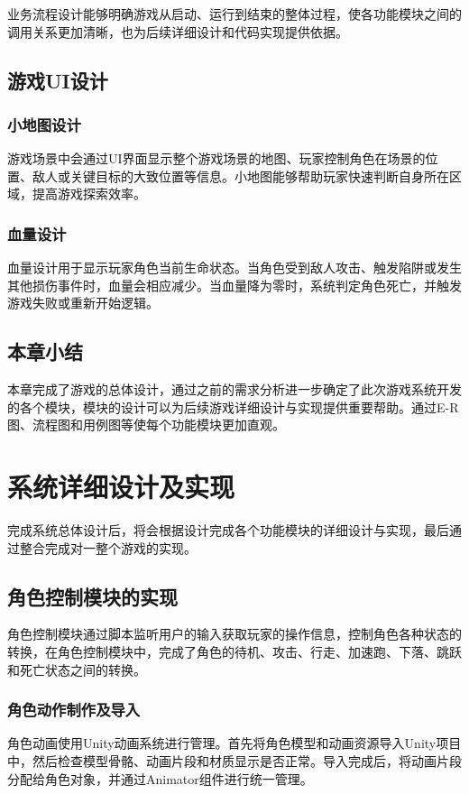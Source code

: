 \documentclass[12pt]{graduate-design-manual}
\begin{document}
业务流程设计能够明确游戏从启动、运行到结束的整体过程，使各功能模块之间的调用关系更加清晰，也为后续详细设计和代码实现提供依据。

\subsection{游戏UI设计}
\subsubsection{小地图设计}
游戏场景中会通过UI界面显示整个游戏场景的地图、玩家控制角色在场景的位置、敌人或关键目标的大致位置等信息。小地图能够帮助玩家快速判断自身所在区域，提高游戏探索效率。

\subsubsection{血量设计}
血量设计用于显示玩家角色当前生命状态。当角色受到敌人攻击、触发陷阱或发生其他损伤事件时，血量会相应减少。当血量降为零时，系统判定角色死亡，并触发游戏失败或重新开始逻辑。

\subsection{本章小结}
本章完成了游戏的总体设计，通过之前的需求分析进一步确定了此次游戏系统开发的各个模块，模块的设计可以为后续游戏详细设计与实现提供重要帮助。通过E-R图、流程图和用例图等使每个功能模块更加直观。

\section{系统详细设计及实现}
完成系统总体设计后，将会根据设计完成各个功能模块的详细设计与实现，最后通过整合完成对一整个游戏的实现。

\subsection{角色控制模块的实现}
角色控制模块通过脚本监听用户的输入获取玩家的操作信息，控制角色各种状态的转换，在角色控制模块中，完成了角色的待机、攻击、行走、加速跑、下落、跳跃和死亡状态之间的转换。

\subsubsection{角色动作制作及导入}
角色动画使用Unity动画系统进行管理。首先将角色模型和动画资源导入Unity项目中，然后检查模型骨骼、动画片段和材质显示是否正常。导入完成后，将动画片段分配给角色对象，并通过Animator组件进行统一管理。
\end{document}
